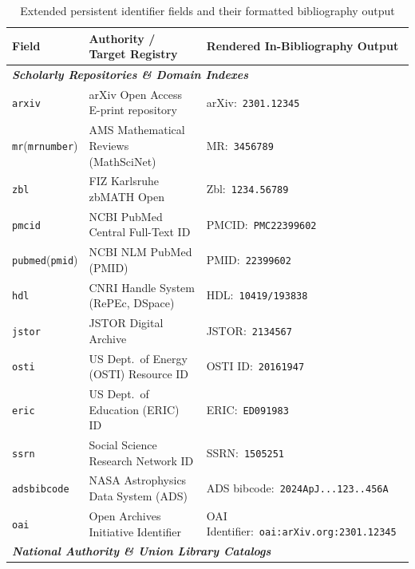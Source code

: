 \documentclass[12pt, twoside]{article}
\begin{document}
\begin{description}
\begin{table}[!ht]
  \centering
  \small
  \caption{Extended persistent identifier fields and their formatted bibliography output}
  \label{tab:addedGlobalPIDs}
  \begin{tabular}{p{2.8cm} | >{\raggedright\arraybackslash}p{6.8cm} | >{\raggedright\arraybackslash}p{5.2cm}}
    \textbf{Field} & \textbf{Authority / Target Registry} & \textbf{Rendered In-Bibliography Output} \\
    \hline
    \multicolumn{3}{l}{\textbf{\textit{Scholarly Repositories \& Domain Indexes}}} \\
    \texttt{arxiv}      & arXiv Open Access E-print repository     & arXiv:\ \nolinkurl{2301.12345} \\
    \texttt{mr}\newline\footnotesize(\texttt{mrnumber})        & AMS Mathematical Reviews (MathSciNet)    & MR:\ \nolinkurl{3456789} \\
    \texttt{zbl}        & FIZ Karlsruhe zbMATH Open                & Zbl:\ \nolinkurl{1234.56789} \\
    \texttt{pmcid}      & NCBI PubMed Central Full-Text ID         & PMCID:\ \nolinkurl{PMC22399602} \\
    \texttt{pubmed}\newline\footnotesize(\texttt{pmid}) & NCBI NLM PubMed (PMID)                   & PMID:\ \nolinkurl{22399602} \\
    \texttt{hdl}        & CNRI Handle System (RePEc, DSpace)       & HDL:\ \nolinkurl{10419/193838} \\
    \texttt{jstor}      & JSTOR Digital Archive                    & JSTOR:\ \nolinkurl{2134567} \\
    \texttt{osti}       & US Dept.\ of Energy (OSTI) Resource ID   & OSTI ID:\ \nolinkurl{20161947} \\
    \texttt{eric}       & US Dept.\ of Education (ERIC) ID         & ERIC:\ \nolinkurl{ED091983} \\
    \texttt{ssrn}       & Social Science Research Network ID       & SSRN:\ \nolinkurl{1505251} \\
    \texttt{adsbibcode} & NASA Astrophysics Data System (ADS)      & ADS bibcode:\ \nolinkurl{2024ApJ...123..456A} \\
    \texttt{oai}        & Open Archives Initiative Identifier      & OAI Identifier:\ \nolinkurl{oai:arXiv.org:2301.12345} \\
    \hline
    \multicolumn{3}{l}{\textbf{\textit{National Authority \& Union Library Catalogs}}} \\

\end{tabular}
\end{table}
\end{description}
\end{document}
